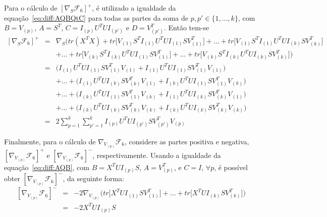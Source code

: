 \documentclass[
    12pt,                %
    oneside,            %
    a4paper,            %
    english,            %
    brazil                %
    ]{abntex2ppgsi}
\begin{document}
Para o cálculo de $[\nabla_S \mathcal{F}_6]^+$, é utilizado a igualdade da equação~\ref{eq:diff:AQBQtC} para todas as partes da soma de $p, p' \in \{1, \dots, k\}$, com $B = V_{(p)}$, $A = S^T$, $C = I_{(p)} U^T U I_{(p')}$ e $D = V_{(p')}^T$.
Então tem-se
\[
    \begin{array}{lcl}
        [\nabla_S \mathcal{F}_6]^+ & = & \nabla_S \Big( tr(X^TX) + tr\big[ V_{(1)} S^T I_{(1)} U^T U I_{(1)} S V_{(1)}^T \big] + \dots + tr\big[ V_{(1)} S^T I_{(1)} U^T U I_{(k)} S V_{(k)}^T \big]  \\
                                   &   & + \dots + tr\big[ V_{(k)} S^T I_{(k)} U^T U I_{(1)} S V_{(1)}^T \big] + \dots + tr\big[ V_{(k)} S^T I_{(k)} U^T U I_{(k)} S V_{(k)}^T \big] \Big) \\
                                   & = & \big( I_{(1)} U^T U I_{(1)} S V_{(1)}^T V_{(1)} + I_{(1)} U^T U I_{(1)} S V_{(1)}^T V_{(1)} \big) \\
                                   &   & + \dots + \big( I_{(1)} U^T U I_{(k)} S V_{(k)}^T V_{(1)} + I_{(k)} U^T U I_{(1)} S V_{(1)}^T V_{(k)} \big) \\
                                   &   & + \dots + \big( I_{(k)} U^T U I_{(1)} S V_{(1)}^T V_{(k)} + I_{(1)} U^T U I_{(k)} S V_{(k)}^T V_{(1)} \big) \\
                                   &   & + \dots + \big( I_{(k)} U^T U I_{(k)} S V_{(k)}^T V_{(k)} + I_{(k)} U^T U I_{(k)} S V_{(k)}^T V_{(k)} \big) \\
                                   & = & 2 \sum_{p=1}^{k} \sum_{p'=1}^{k} I_{(p)} U^T U I_{(p')} S V_{(p')}^T V_{(p)}
    \end{array}
\]


Finalmente, para o cálculo de $\nabla_{V_{(p)}} \mathcal{F}_6$, considere as partes positiva e negativa, $[\nabla_{V_{(p)}} \mathcal{F}_6]^+$ e $[\nabla_{V_{(p)}} \mathcal{F}_6]^-$, respectivamente. Usando a igualdade da equação~\ref{eq:diff:AQB}, com $B = X^T U I_{(p)} S$, $A = V^{T}_{(p)}$, e $C = I$, $\forall p$, é possível obter $[\nabla_{V_{(p)}} \mathcal{F}_6]^-$, da seguinte forma:
\[
    \begin{array}{lcl}
        [\nabla_{V_{(p)}} \mathcal{F}_6]^- & = & - 2 \nabla_{V_{(p)}} \Big( tr\big[ X^T U I_{(1)}SV_{(1)}^T \big] + \dots + tr\big[ X^T U I_{(k)}SV_{(k)}^T \big] \Big) \\
                                           & = & - 2 X^T U I_{(p)} S
    \end{array}
\]
\end{document}

